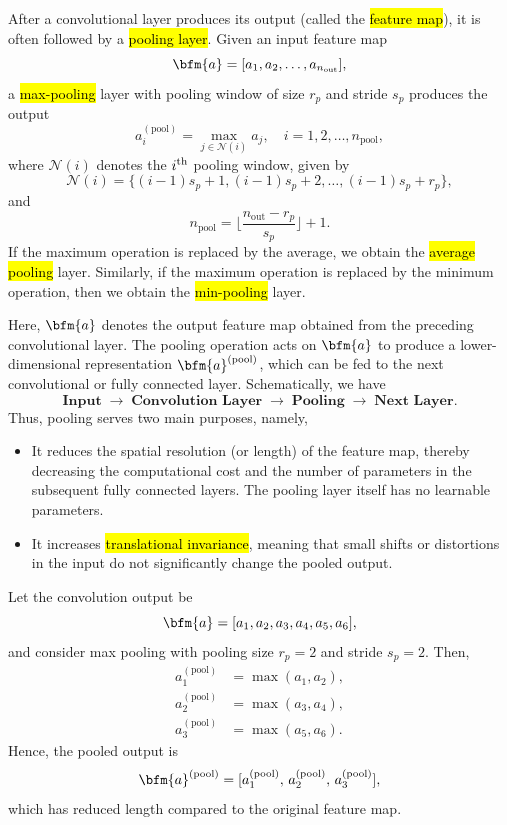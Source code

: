 \begin{remark}

After a convolutional layer produces its output (called the \hl{feature map}), it is often followed by a \hl{pooling layer}. 
Given an input feature map
$$
\bfm{a} = [a_1, a_2, \ldots, a_{n_{\text{out}}}],
$$
a \hl{max-pooling} layer with pooling window of size $r_p$ and stride $s_p$ produces the output
$$
a_i^{(\text{pool})} = \max_{j \in \mathcal{N}(i)} a_j, \quad i = 1, 2, \ldots, n_{\text{pool}},
$$
where $\mathcal{N}(i)$ denotes the $i^{\rm th}$ pooling window, given by
$$
\mathcal{N}(i) = \{(i-1)s_p + 1, (i-1)s_p + 2, \ldots, (i-1)s_p + r_p\},
$$
and
$$
n_{\text{pool}} = \Big\lfloor \frac{n_{\text{out}} - r_p}{s_p} \Big\rfloor + 1.
$$
If the maximum operation is replaced by the average, we obtain the \hl{average pooling} layer. Similarly, if the maximum operation is replaced by the minimum operation, then we obtain the \hl{min-pooling} layer.

Here, $\bfm{a}$ denotes the output feature map obtained from the preceding convolutional layer.  
The pooling operation acts on $\bfm{a}$ to produce a lower-dimensional representation 
$\bfm{a}^{(\text{pool})}$, which can be fed to the next convolutional or fully connected layer.
Schematically, we have
\[
\textbf{Input} 
\;\xrightarrow{\text{}}\;
\textbf{Convolution Layer} 
\;\xrightarrow{\text{}}\;
\textbf{Pooling}
\;\xrightarrow{\text{}}\;
\textbf{Next Layer}.
\]
  Thus, pooling serves two main purposes, namely,
\begin{itemize}
    \item It reduces the spatial resolution (or length) of the feature map, thereby decreasing the computational cost and the number of parameters in the subsequent fully connected layers. The pooling layer itself has no learnable parameters.
    \item It increases \hl{translational invariance}, meaning that small shifts or distortions in the input do not significantly change the pooled output.
\end{itemize}
\end{remark}
\begin{example}
Let the convolution output be
\[
\bfm{a} = [a_1, a_2, a_3, a_4, a_5, a_6],
\]
and consider max pooling with pooling size $r_p=2$ and stride $s_p=2$.  
Then,
\[
\begin{aligned}
a^{(\text{pool})}_1 &= \max(a_1, a_2),\\
a^{(\text{pool})}_2 &= \max(a_3, a_4),\\
a^{(\text{pool})}_3 &= \max(a_5, a_6).
\end{aligned}
\]
Hence, the pooled output is
\[
\bfm{a}^{(\text{pool})} = [a^{(\text{pool})}_1,\, a^{(\text{pool})}_2,\, a^{(\text{pool})}_3],
\]
which has reduced length compared to the original feature map.
\end{example}

